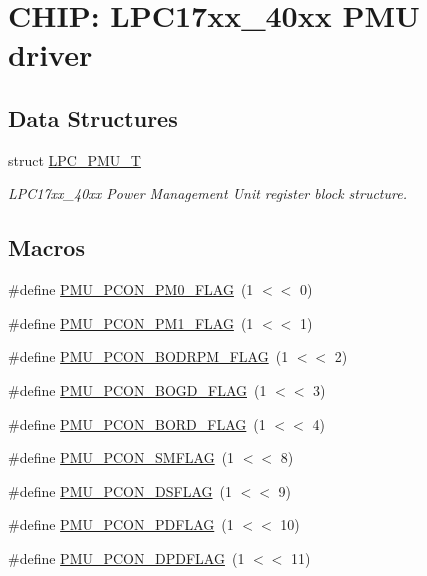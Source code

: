 \hypertarget{group__PMU__17XX__40XX}{\section{C\-H\-I\-P\-: L\-P\-C17xx\-\_\-40xx P\-M\-U driver}
\label{group__PMU__17XX__40XX}
}
\subsection*{Data Structures}
\begin{DoxyCompactItemize}
\item 
struct \hyperlink{structLPC__PMU__T}{L\-P\-C\-\_\-\-P\-M\-U\-\_\-\-T}
\begin{DoxyCompactList}\small\item\em L\-P\-C17xx\-\_\-40xx Power Management Unit register block structure. \end{DoxyCompactList}\end{DoxyCompactItemize}
\subsection*{Macros}
\begin{DoxyCompactItemize}
\item 
\#define \hyperlink{group__PMU__17XX__40XX_ga68db97d4dfb92acf82b041ddbbfa692d}{P\-M\-U\-\_\-\-P\-C\-O\-N\-\_\-\-P\-M0\-\_\-\-F\-L\-A\-G}~(1 $<$$<$ 0)
\item 
\#define \hyperlink{group__PMU__17XX__40XX_gadd225d4b566562b24c0ccc3d8efa7372}{P\-M\-U\-\_\-\-P\-C\-O\-N\-\_\-\-P\-M1\-\_\-\-F\-L\-A\-G}~(1 $<$$<$ 1)
\item 
\#define \hyperlink{group__PMU__17XX__40XX_gaf798eacf7261001d57b70bf4c3b9b863}{P\-M\-U\-\_\-\-P\-C\-O\-N\-\_\-\-B\-O\-D\-R\-P\-M\-\_\-\-F\-L\-A\-G}~(1 $<$$<$ 2)
\item 
\#define \hyperlink{group__PMU__17XX__40XX_ga542e24814279146e498ede308451d699}{P\-M\-U\-\_\-\-P\-C\-O\-N\-\_\-\-B\-O\-G\-D\-\_\-\-F\-L\-A\-G}~(1 $<$$<$ 3)
\item 
\#define \hyperlink{group__PMU__17XX__40XX_gad8a99ac828a3f50ca487efb9bab7cba1}{P\-M\-U\-\_\-\-P\-C\-O\-N\-\_\-\-B\-O\-R\-D\-\_\-\-F\-L\-A\-G}~(1 $<$$<$ 4)
\item 
\#define \hyperlink{group__PMU__17XX__40XX_gabcad2ba661df07512a8facf72ad718a3}{P\-M\-U\-\_\-\-P\-C\-O\-N\-\_\-\-S\-M\-F\-L\-A\-G}~(1 $<$$<$ 8)
\item 
\#define \hyperlink{group__PMU__17XX__40XX_ga35db160b23010e0f598641f1f40ebd15}{P\-M\-U\-\_\-\-P\-C\-O\-N\-\_\-\-D\-S\-F\-L\-A\-G}~(1 $<$$<$ 9)
\item 
\#define \hyperlink{group__PMU__17XX__40XX_gabad3cddc54f9c1cdd8128ec65fc50691}{P\-M\-U\-\_\-\-P\-C\-O\-N\-\_\-\-P\-D\-F\-L\-A\-G}~(1 $<$$<$ 10)
\item 
\#define \hyperlink{group__PMU__17XX__40XX_ga81cd6baf090cf4649f51538b59e2e4af}{P\-M\-U\-\_\-\-P\-C\-O\-N\-\_\-\-D\-P\-D\-F\-L\-A\-G}~(1 $<$$<$ 11)
\end{DoxyCompactItemize}
